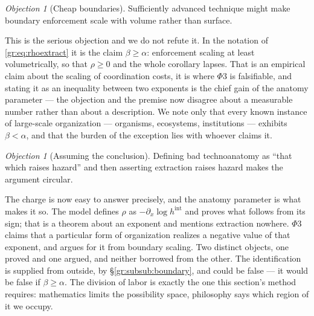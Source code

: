 \documentclass[11pt]{article}
\numberwithin{equation}{section}
\theoremstyle{plain}
\theoremstyle{definition}
\theoremstyle{remark}
\newtheorem{objection}[theorem]{Objection}
\begin{document}
\begin{objection}[Cheap boundaries]\label{gr:obj:cheap}
Sufficiently advanced technique might make boundary enforcement scale
with volume rather than surface.
\end{objection}

\noindent This is the serious objection and we do not refute it. In the
notation of \eqref{gr:eq:rhoextract} it is the claim $\beta\ge\alpha$:
enforcement scaling at least volumetrically, so that $\rho\ge0$ and the
whole corollary lapses. That is an empirical claim about the scaling of
coordination costs, it is where $\Phi3$ is falsifiable, and stating it
as an inequality between two exponents is the chief gain of the anatomy
parameter --- the objection and the premise now disagree about a
measurable number rather than about a description. We note only that
every known instance of large-scale organization --- organisms,
ecosystems, institutions --- exhibits $\beta<\alpha$, and that the
burden of the exception lies with whoever claims it.

\begin{objection}[Assuming the conclusion]\label{gr:obj:circular}
Defining bad technoanatomy as ``that which raises hazard'' and then
asserting extraction raises hazard makes the argument circular.
\end{objection}

\noindent The charge is now easy to answer precisely, and the anatomy
parameter is what makes it so. The model defines $\rho$ as
$-\partial_x\log h^{\mathrm{int}}$ and proves what follows from its
sign; that is a theorem about an exponent and mentions extraction
nowhere. $\Phi3$ claims that a particular form of organization realizes
a negative value of that exponent, and argues for it from boundary
scaling. Two distinct objects, one proved and one argued, and neither
borrowed from the other. The identification is supplied from outside,
by \S\ref{gr:subsub:boundary}, and could be false --- it would be false
if $\beta\ge\alpha$. The division of labor is exactly the one this section's method
requires: mathematics limits the possibility space, philosophy says
which region of it we occupy.
\end{document}
